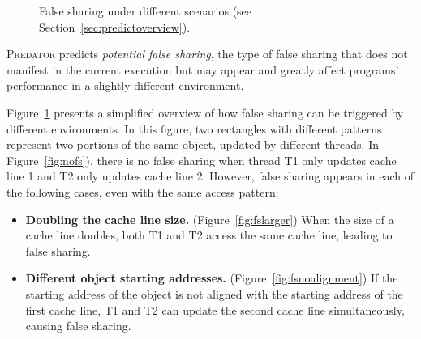 \documentclass[10pt]{sigplanconf}
\newcommand{\Predator}{{\scshape Predator}}
\begin{document}
\begin{figure}
\begin{center} 
%
\hspace{30pt}
%
\hspace{30pt}
%
\end{center}
\caption{False sharing under different scenarios (see Section~\ref{sec:predictoverview}).}
\label{fig:potentialfalsesharing}
\end{figure}

\Predator{} predicts {\it potential false sharing}, the type of
false sharing that does not 
manifest in the current execution but may appear and greatly affect programs' performance
in a slightly different environment.

Figure~\ref{fig:potentialfalsesharing} presents a simplified overview of how false sharing can be triggered 
by different environments.
In this figure, two rectangles with different patterns
represent two portions of the same object, updated by different threads. 
In Figure~\ref{fig:nofs}), there is no false sharing when thread T1 only updates 
cache line 1 and T2 only updates cache line 2.
However, false sharing appears in each of the following cases, even with the same
access pattern:

\begin{itemize}
\item \textbf{Doubling the cache line size.} (Figure~\ref{fig:fslarger}) When the size of a
cache line doubles,
both T1 and T2 access the same cache line, leading to false sharing.

\item \textbf{Different object starting addresses.} (Figure~\ref{fig:fsnoalignment})
If the starting address of the object is not aligned with the starting address of 
the first cache line, 
T1 and T2 can update the second cache line simultaneously, 
causing false sharing. 
\end{itemize} 
\end{document}
